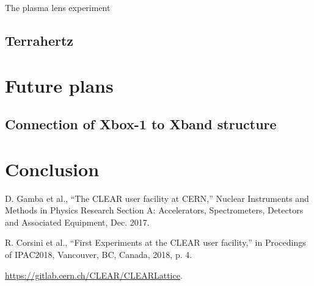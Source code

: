 \documentclass[a4paper,
               keeplastbox,   %
               ]{jacow}
\begin{document}
The plasma lens experiment


\subsection{Terrahertz}


\section{Future plans}

\subsection{Connection of Xbox-1 to Xband structure}

\section{Conclusion}

\begin{thebibliography}{9} %
     D. Gamba et al., “The CLEAR user facility at CERN,” Nuclear Instruments and Methods in Physics Research Section A: Accelerators, Spectrometers, Detectors and Associated Equipment, Dec. 2017.
    
     R. Corsini et al., “First Experiments at the CLEAR user facility,” in Procedings of IPAC2018, Vancouver, BC, Canada, 2018, p. 4.
    
     \url{https://gitlab.cern.ch/CLEAR/CLEARLattice}.

\end{thebibliography}
\end{document}
